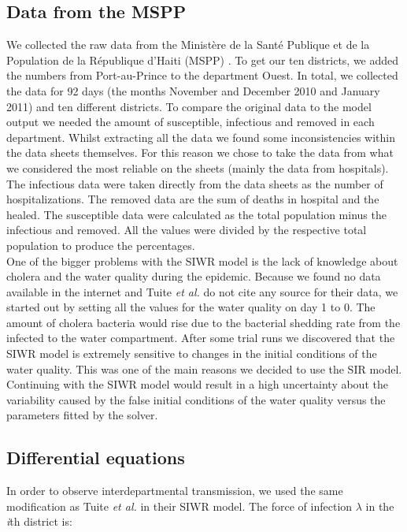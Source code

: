 \documentclass[11pt]{article}
\begin{document}
\subsection{Data from the MSPP}
We collected the raw data from the Minist\`{e}re de la Sant\'{e} Publique et de la Population de la R\'{e}publique d'Haiti (MSPP) \cite{web:MSPP}. To get our ten districts, we added the numbers from Port-au-Prince to the department Ouest. In total, we collected the data for 92 days (the months November and December 2010 and January 2011) and ten different districts. To compare the original data to the model output we needed the amount of susceptible, infectious and removed in each department. Whilst extracting all the data we found some inconsistencies within the data sheets themselves. For this reason we chose to take the data from what we considered the most reliable on the sheets (mainly the data from hospitals). The infectious data were taken directly from the data sheets as the number of hospitalizations. The removed data are the sum of deaths in hospital and the healed. The susceptible data were calculated as the total population minus the infectious and removed. All the values were divided by the respective total population to produce the percentages.\\
One of the bigger problems with the SIWR model is the lack of knowledge about cholera and the water quality during the epidemic. Because we found no data available in the internet and Tuite \textit{et al.} \cite{tuite:2011} do not cite any source for their data, we started out by setting all the values for the water quality on day 1 to 0. The amount of cholera bacteria would rise due to the bacterial shedding rate from the infected to the water compartment. After some trial runs we discovered that the SIWR model is extremely sensitive to changes in the initial conditions of the water quality. This was one of the main reasons we decided to use the SIR model. Continuing with the SIWR model would result in a high uncertainty about the variability caused by the false initial conditions of the water quality versus the parameters fitted by the solver.






\subsection{Differential equations}
In order to observe interdepartmental transmission, we used the same modification as Tuite \textit{et al.} \cite{tuite:2011} in their SIWR model. The force of infection $\lambda$ in the \textit{i}th district is:
\end{document}
